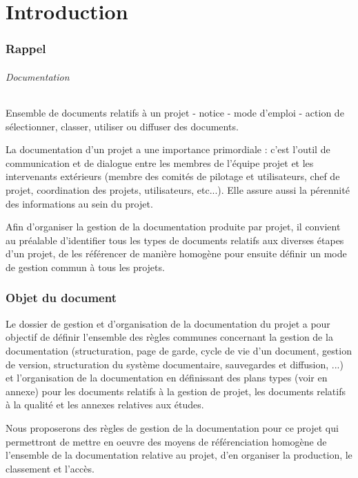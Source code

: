 \documentclass[a4paper]{article}
\begin{document}
\part{Introduction}

\section{Rappel}

\paragraph{Documentation} Ensemble de documents relatifs à un projet - notice - mode d’emploi - action de sélectionner, classer, utiliser ou diffuser des documents.

La documentation d’un projet a une importance primordiale : c’est l’outil de communication et de dialogue entre les membres de l’équipe projet et les intervenants extérieurs (membre des comités de pilotage et utilisateurs, chef de projet, coordination des projets, utilisateurs, etc...). Elle assure aussi la pérennité des informations au sein du projet.

Afin d’organiser la gestion de la documentation produite par projet, il convient au préalable d’identifier tous les types de documents relatifs aux diverses étapes d’un projet, de les référencer de manière homogène pour ensuite définir un mode de gestion commun à tous les projets.

\section{Objet du document}

Le dossier de gestion et d'organisation de la documentation du projet a pour objectif de définir l’ensemble des règles
communes concernant la gestion de la documentation (structuration, page de garde, cycle de vie d’un
document, gestion de version, structuration du système documentaire, sauvegardes et diffusion, ...) et
l’organisation de la documentation en définissant des plans types (voir en annexe) pour les documents relatifs à la gestion de
projet, les documents relatifs à la qualité et les annexes relatives aux études.

Nous proposerons des règles de gestion de la documentation pour ce projet qui permettront de mettre en oeuvre des moyens
de référenciation homogène de l'ensemble de la documentation relative au projet, d'en organiser la production, le classement
et l'accès.
\end{document}

